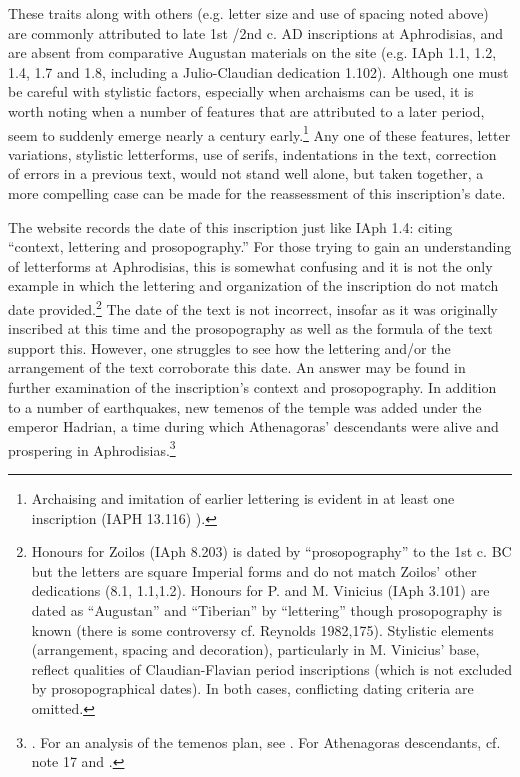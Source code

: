 \documentclass[amsthm,ebook]{saparticle}
\begin{document}
These traits along with others (e.g. letter size and use of spacing noted above) are commonly attributed to late 1st
/2nd c. AD inscriptions at Aphrodisias, and are absent from comparative Augustan materials on the site (e.g. IAph 1.1,
1.2, 1.4, 1.7 and 1.8, including a Julio-Claudian dedication 1.102). Although one must be careful with stylistic
factors, especially when archaisms can be used, it is worth noting when a number of features that are attributed to a
later period, seem to suddenly emerge nearly a century early.\footnote{ Archaising and imitation of earlier lettering
is evident in at least one inscription (IAPH 13.116) \citet[155-166]{reynolds1982}). } Any one of these features, letter
variations, stylistic letterforms, use of serifs, indentations in the text, correction of errors in a previous text,
would not stand well alone, but taken together, a more compelling case can be made for the reassessment of this
inscription’s date. 




The website records the date of this inscription just like IAph 1.4: citing ``context, lettering and prosopography.'' For
those trying to gain an understanding of letterforms at Aphrodisias, this is somewhat confusing and it is not the only
example in which the lettering and organization of the inscription do not match date provided.\footnote{ Honours for
Zoilos (IAph 8.203) is dated by ``prosopography'' to the 1st c. BC but the letters are square Imperial forms and do not
match Zoilos’ other dedications (8.1, 1.1,1.2). Honours for P. and M. Vinicius (IAph 3.101) are dated as ``Augustan'' and
``Tiberian'' by ``lettering'' though prosopography is known (there is some controversy cf. Reynolds 1982,175). Stylistic
elements (arrangement, spacing and decoration), particularly in M. Vinicius’ base, reflect qualities of
Claudian-Flavian period inscriptions (which is not excluded by prosopographical dates). In both cases, conflicting
dating criteria are omitted. } The date of the text is not incorrect, insofar as it was originally inscribed at
this time and the prosopography as well as the formula of the text support this. However, one struggles to see how
the lettering and/or the arrangement of the text corroborate this date. An answer may be found in further examination
of the inscription’s context and prosopography. In addition to a number of earthquakes, new temenos of the temple was
added under the emperor Hadrian, a time during which Athenagoras’ descendants were alive and prospering in
Aphrodisias.\footnote{\citep[43]{smith1995}. For an analysis of the temenos plan, see \citet[66-74]{doruk1990}. For Athenagoras descendants, cf. note 17 and \citet[327-334]{reynolds1999}.} 
\end{document}
